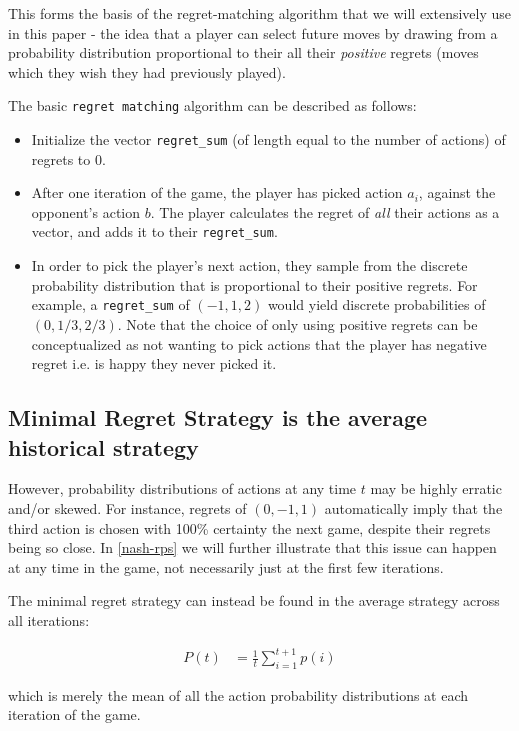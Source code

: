 \documentclass [11pt]{article}
\begin{document}
This forms the basis of the regret-matching algorithm that we will extensively use in this paper - the idea that a player can select future moves by drawing from a probability distribution proportional to their all their \textit{positive} regrets (moves which they wish they had previously played).

The basic \texttt{regret matching} algorithm can be described as follows:

\begin{itemize}
  \item Initialize the vector \texttt{regret\_sum} (of length equal to the number of actions) of regrets to 0.
  \item After one iteration of the game, the player has picked action $a_i$, against the opponent's action $b$. The player calculates the regret of \textit{all} their actions as a vector, and adds it to their \texttt{regret\_sum}.
  \item In order to pick the player's next action, they sample from the discrete probability distribution that is proportional to their positive regrets. For example, a \texttt{regret\_sum} of $(-1, 1, 2)$ would yield discrete probabilities of $(0, 1/3, 2/3)$. Note that the choice of only using positive regrets can be conceptualized as not wanting to pick actions that the player has negative regret i.e. is happy they never picked it.
\end{itemize}

\subsection{Minimal Regret Strategy is the average historical strategy} \label{avg-strat}

However, probability distributions of actions at any time $t$ may be highly erratic and/or skewed. For instance, regrets of $(0, -1, 1)$ automatically imply that the third action is chosen with 100\% certainty the next game, despite their regrets being so close. In \ref{nash-rps} we will further illustrate that this issue can happen at any time in the game, not necessarily just at the first few iterations.

The minimal regret strategy can instead be found in the average strategy across all iterations:

\begin{align}
  P(t) & = \frac{1}{t} \sum_{i=1}^{t + 1} p(i)
\end{align}

which is merely the mean of all the action probability distributions at each iteration of the game.
\end{document}
